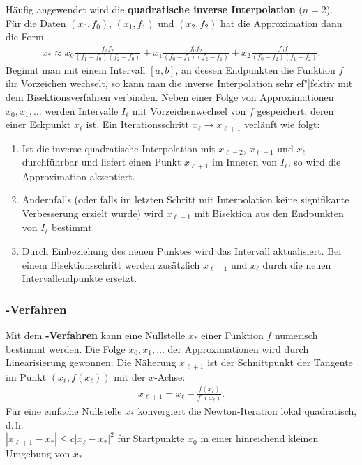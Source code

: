 Häufig angewendet wird die
\textbf{quadratische inverse Interpolation} ($n = 2$). \\
Für die Daten $(x_0, f_0)$, $(x_1, f_1)$ und $(x_2, f_2)$ hat die
Approximation dann die Form
\begin{align*}
    x_\ast \approx
    x_0 \frac{f_1 f_2}{(f_1 - f_0)(f_2 - f_0)} +
    x_1 \frac{f_0 f_2}{(f_0 - f_1)(f_2 - f_1)} +
    x_2 \frac{f_0 f_1}{(f_0 - f_2)(f_1 - f_2)}.
\end{align*}
Beginnt man mit einem Intervall $[a, b]$, an dessen Endpunkten
die Funktion $f$ ihr Vorzeichen wechselt, so kann man die inverse Interpolation
sehr ef"|fektiv mit dem Bisektionsverfahren verbinden.
Neben einer Folge von Approximationen $x_0, x_1, \dotsc$ werden Intervalle
$I_\ell$ mit Vorzeichenwechsel von $f$ gespeichert, deren einer
Eckpunkt $x_\ell$ ist. Ein Iterationsschritt $x_\ell \rightarrow x_{\ell+1}$
verläuft wie folgt:
\begin{enumerate}
    \item
    Ist die inverse quadratische Interpolation mit $x_{\ell-2}$, $x_{\ell-1}$
    und $x_\ell$ durchführbar und liefert einen Punkt $x_{\ell+1}$ im Inneren
    von $I_\ell$, so wird die Approximation akzeptiert.

    \item
    Andernfalls (oder falls im letzten Schritt mit Interpolation keine
    signifikante Verbesserung erzielt wurde) wird $x_{\ell+1}$ mit Bisektion
    aus den Endpunkten von $I_\ell$ bestimmt.

    \item
    Durch Einbeziehung des neuen Punktes wird das Intervall aktualisiert.
    Bei einem Bisektionsschritt werden zusätzlich $x_{\ell-1}$ und $x_\ell$
    durch die neuen Intervallendpunkte ersetzt.
\end{enumerate}

\pagebreak

\subsubsection{%
    -Verfahren%
}

Mit dem \textbf{-Verfahren} kann eine Nullstelle $x_\ast$ einer
Funktion $f$ numerisch bestimmt werden.
Die Folge $x_0, x_1, \dotsc$ der Approximationen wird durch Linearisierung
gewonnen.
Die Näherung $x_{\ell+1}$ ist der Schnittpunkt der Tangente im
Punkt $(x_\ell, f(x_\ell))$ mit der $x$-Achse:
\begin{align*}
    x_{\ell+1} = x_\ell - \frac{f(x_\ell)}{f'(x_\ell)}.
\end{align*}
Für eine einfache Nullstelle $x_\ast$ konvergiert die Newton-Iteration
lokal quadratisch, d.\,h. \\
$|x_{\ell+1} - x_\ast| \le c |x_\ell - x_\ast|^2$
für Startpunkte $x_0$ in einer hinreichend kleinen Umgebung von $x_\ast$.

